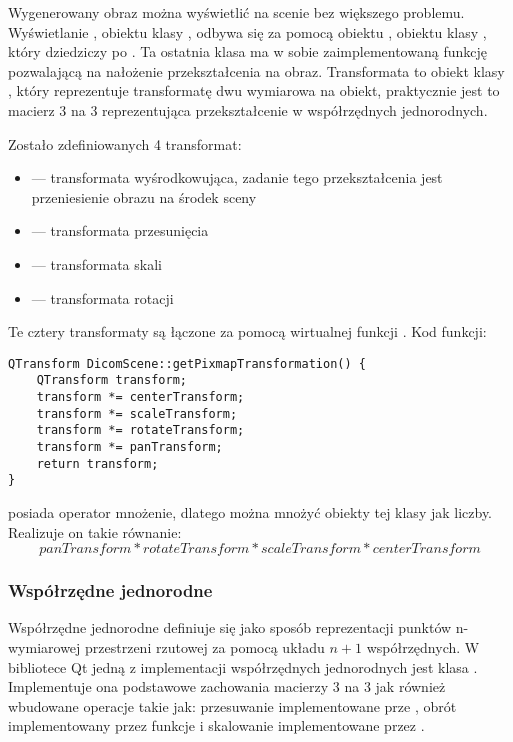 \label{sec:algorithm-pixmap-tranformat}

\par
Wygenerowany obraz można wyświetlić na scenie bez większego problemu.
Wyświetlanie , obiektu klasy , odbywa się za pomocą obiektu , obiektu klasy , który dziedziczy po .
Ta ostatnia klasa ma w sobie zaimplementowaną funkcję pozwalającą na nałożenie przekształcenia na obraz.
Transformata to obiekt klasy , który reprezentuje transformatę dwu wymiarowa na obiekt, praktycznie jest to macierz 3 na 3 reprezentująca przekształcenie w współrzędnych jednorodnych.
\par

Zostało zdefiniowanych 4 transformat:
\begin{itemize}
    \item {} --- transformata wyśrodkowująca, zadanie tego przekształcenia jest przeniesienie obrazu na środek sceny
    \item {} --- transformata przesunięcia
    \item {} --- transformata skali
    \item {} --- transformata rotacji
\end{itemize}

Te cztery transformaty są łączone za pomocą wirtualnej funkcji .
Kod funkcji:
\begin{lstlisting}
QTransform DicomScene::getPixmapTransformation() {
	QTransform transform;
	transform *= centerTransform;
	transform *= scaleTransform;
	transform *= rotateTransform;
	transform *= panTransform;
	return transform;
}
\end{lstlisting}
 posiada operator mnożenie, dlatego można mnożyć obiekty tej klasy jak liczby.
Realizuje on takie równanie:
\[panTransform*rotateTransform*scaleTransform*centerTransform\]

\subsubsection{Współrzędne jednorodne}

Współrzędne jednorodne definiuje się jako sposób reprezentacji punktów n-wymiarowej przestrzeni rzutowej za pomocą układu $n+1$ współrzędnych.
W bibliotece Qt jedną z implementacji współrzędnych jednorodnych jest klasa .
Implementuje ona podstawowe zachowania macierzy 3 na 3 jak również wbudowane operacje takie jak: przesuwanie implementowane prze , obrót implementowany przez funkcje  i skalowanie implementowane przez .

